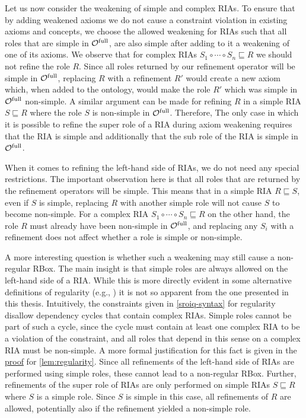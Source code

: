 
Let us now consider the weakening of simple and complex RIAs. To ensure that by adding weakened axioms we do not cause a constraint violation in existing axioms and concepts, we choose the allowed weakening for RIAs such that all roles that are simple in ${\mathcal{O}^\textnormal{full}}$, are also simple after adding to it a weakening of one of its axioms. We observe that for complex RIAs $S_1 \circ \cdots \circ S_n \sqsubseteq R$ we should not refine the role $R$. Since all roles returned by our refinement operator will be simple in ${\mathcal{O}^\textnormal{full}}$, replacing $R$ with a refinement $R'$ would create a new axiom which, when added to the ontology, would make the role $R'$ which was simple in ${\mathcal{O}^\textnormal{full}}$ non-simple. A similar argument can be made for refining $R$ in a simple RIA $S \sqsubseteq R$ where the role $S$ is non-simple in ${\mathcal{O}^\textnormal{full}}$. Therefore, The only case in which it is possible to refine the super role of a RIA during axiom weakening requires that the RIA is simple and additionally that the sub role of the RIA is simple in ${\mathcal{O}^\textnormal{full}}$.

When it comes to refining the left-hand side of RIAs, we do not need any special restrictions. The important observation here is that all roles that are returned by the refinement operators will be simple. This means that in a simple RIA $R \sqsubseteq S$, even if $S$ is simple, replacing $R$ with another simple role will not cause $S$ to become non-simple. For a complex RIA $S_1 \circ \cdots \circ S_n \sqsubseteq R$ on the other hand, the role $R$ must already have been non-simple in ${\mathcal{O}^\textnormal{full}}$, and replacing any $S_i$ with a refinement does not affect whether a role is simple or non-simple.

A more interesting question is whether such a weakening may still cause a non-regular RBox. The main insight is that simple roles are always allowed on the left-hand side of a RIA. While this is more directly evident in some alternative definitions of regularity (e.g., \cite{rudolph2011foundations}) it is not so apparent from the one presented in this thesis. Intuitively, the constraints given in \cref{sroiq-syntax} for regularity disallow dependency cycles that contain complex RIAs. Simple roles cannot be part of such a cycle, since the cycle must contain at least one complex RIA to be a violation of the constraint, and all roles that depend in this sense on a complex RIA must be non-simple. A more formal justification for this fact is given in the \hyperref[proof:regularity]{proof} for \cref{lem:regularity}. Since all refinements of the left-hand side of RIAs are performed using simple roles, these cannot lead to a non-regular RBox. Further, refinements of the super role of RIAs are only performed on simple RIAs $S \sqsubseteq R$ where $S$ is a simple role. Since $S$ is simple in this case, all refinements of $R$ are allowed, potentially also if the refinement yielded a non-simple role.

